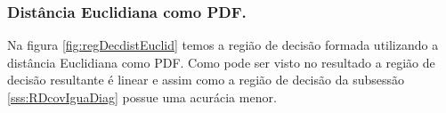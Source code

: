 \documentclass[ 
	article,			%
	11pt,				%
	oneside,			%
	a4paper,			%
	english,			%
	brazil,				%
	]{abntex2}
\begin{document}
\subsubsection{ Distância Euclidiana como PDF.}
Na figura \ref{fig:regDecdistEuclid} temos a região de decisão formada
utilizando a distância Euclidiana como PDF. Como pode ser visto no resultado a
região de decisão resultante é linear e assim como a região de decisão da
subsessão \ref{sss:RDcovIguaDiag} possue uma acurácia menor.
% 
% 
% 
\end{document}

